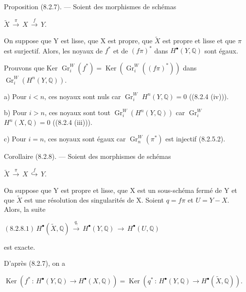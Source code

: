 \documentclass[11pt,twoside]{article}
\newcommand{\DFormula}[1]{%
  \par\smallskip\noindent\hspace*{0pt}\(\displaystyle #1\)\par\smallskip
}
\begin{document}
Proposition (8.2.7). — Soient des morphismes de schémas\par
\par\medskip
\DFormula{\widetilde{X}\,\xrightarrow{\pi }\,X\,\xrightarrow{f}\,Y.}
\par\medskip
On suppose que Y est lisse, que X est propre, que \(\widetilde{X}\) est propre et lisse et que \(\pi \) est surjectif. Alors, les noyaux de \(f^{\ast }\) et de \((f\pi )^{\ast }\) dans \(H^{\bullet }(Y,\mathbb{Q})\) sont égaux.\par
\par\medskip
Prouvons que Ker \(\operatorname{Gr}_{i}^{W}(f^{\ast })=\operatorname{Ker}(\operatorname{Gr}_{i}^{W}((f\pi )^{\ast }))\) dans \(\operatorname{Gr}_{i}^{W}(H^{n}(Y,\mathbb{Q}))\).\par
\par\medskip
a) Pour \(i<n\), ces noyaux sont nuls car \(\operatorname{Gr}_{i}^{W}\) \(H^{n}(Y,\mathbb{Q})=0\) ((8.2.4 (iv))).\par
\par\medskip
b) Pour \(i>n\), ces noyaux sont tout \(\operatorname{Gr}_{i}^{W}(H^{n}(Y,\mathbb{Q}))\) car \(\operatorname{Gr}_{i}^{W}\) \(H^{n}(X,\mathbb{Q})=0\) ((8.2.4 (iii))).\par
\par\medskip
c) Pour \(i=n\), ces noyaux sont égaux car \(\operatorname{Gr}_{n}^{W}(\pi ^{\ast })\) est injectif (8.2.5.2).\par
\par\medskip
Corollaire (8.2.8). — Soient des morphismes de schémas\par
\par\medskip
\DFormula{\widetilde{X}\,\xrightarrow{\pi }\,X\,\overset{f}{\hookrightarrow}\,Y.}
\par\medskip
On suppose que Y est propre et lisse, que X est un sous-schéma fermé de Y et que \(\widetilde{X}\) est une résolution des singularités de X. Soient \(q=f\pi \) et \(U=Y−X\). Alors, la suite\par
\par\medskip
\DFormula{(8.2.8.1)\,H^{\bullet }(\widetilde{X},\mathbb{Q})\,\xrightarrow{q_{!}}\,H^{\bullet }(Y,\mathbb{Q})\,\to \,H^{\bullet }(U,\mathbb{Q})}
\par\medskip
est exacte.\par
\par\medskip
D’après (8.2.7), on a\par
\par\medskip
\DFormula{\operatorname{Ker}(f^{\ast }\,:\,H^{\bullet }(Y,\mathbb{Q})\to H^{\bullet }(X,\mathbb{Q}))=\operatorname{Ker}(q^{\ast }\,:\,H^{\bullet }(Y,\mathbb{Q})\to H^{\bullet }(\widetilde{X},\mathbb{Q})).}
\end{document}
